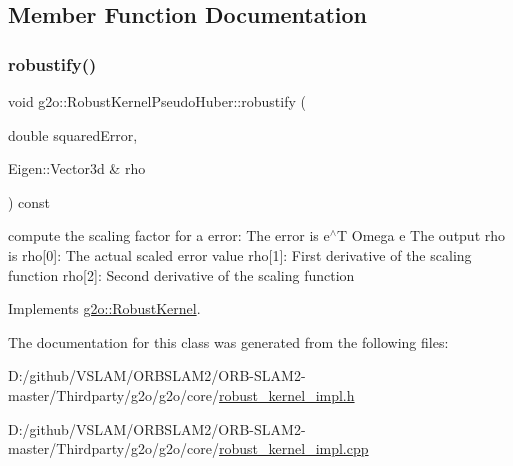 \subsection{Member Function Documentation}
\mbox{\label{classg2o_1_1_robust_kernel_pseudo_huber_a7dab9bbb0e6f204a5f863220d606b0da}} 
\subsubsection{\texorpdfstring{robustify()}{robustify()}}
{\footnotesize\ttfamily void g2o\+::\+Robust\+Kernel\+Pseudo\+Huber\+::robustify (\begin{DoxyParamCaption}\item[{double}]{squared\+Error,  }\item[{Eigen\+::\+Vector3d \&}]{rho }\end{DoxyParamCaption}) const\hspace{0.3cm}{\ttfamily [virtual]}}

compute the scaling factor for a error\+: The error is e$^\wedge$T Omega e The output rho is rho\mbox{[}0\mbox{]}\+: The actual scaled error value rho\mbox{[}1\mbox{]}\+: First derivative of the scaling function rho\mbox{[}2\mbox{]}\+: Second derivative of the scaling function 

Implements \mbox{\hyperlink{classg2o_1_1_robust_kernel_ab47b071a0cfe466be063f0104bc41d0f}{g2o\+::\+Robust\+Kernel}}.



The documentation for this class was generated from the following files\+:\begin{DoxyCompactItemize}
\item 
D\+:/github/\+V\+S\+L\+A\+M/\+O\+R\+B\+S\+L\+A\+M2/\+O\+R\+B-\/\+S\+L\+A\+M2-\/master/\+Thirdparty/g2o/g2o/core/\mbox{\hyperlink{robust__kernel__impl_8h}{robust\+\_\+kernel\+\_\+impl.\+h}}\item 
D\+:/github/\+V\+S\+L\+A\+M/\+O\+R\+B\+S\+L\+A\+M2/\+O\+R\+B-\/\+S\+L\+A\+M2-\/master/\+Thirdparty/g2o/g2o/core/\mbox{\hyperlink{robust__kernel__impl_8cpp}{robust\+\_\+kernel\+\_\+impl.\+cpp}}\end{DoxyCompactItemize}
